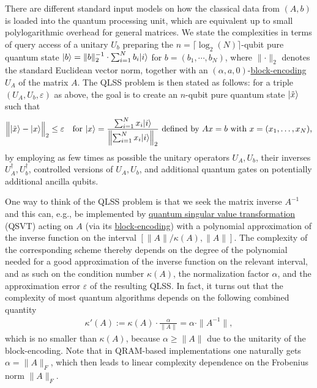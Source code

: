 \begin{refsection}
There are different standard input models on how the classical data from $(A,b)$ is loaded into the quantum processing unit, which are equivalent up to small polylogarithmic overhead for general matrices. We state the complexities in terms of query access of a unitary $U_b$ preparing the $n=\lceil\log_2(N)\rceil$-qubit pure quantum state $\lvert b\rangle=\|b\|_2^{-1}\cdot\sum_{i=1}^Nb_i\lvert i\rangle$ for $b=(b_1,\cdots,b_N)$, where $\lVert \cdot \rVert_2$ denotes the standard Euclidean vector norm, together with an $(\alpha,a,0)$-\hyperref[prim:BlockEncodings]{block-encoding} $U_A$ of the matrix $A$. The QLSS problem is then stated as follows: for a triple $(U_A,U_b,\varepsilon)$ as above, the goal is to create an $n$-qubit pure quantum state $ \lvert\tilde x\rangle$ such that
\begin{align}\label{eq:regression}
\Big\|\lvert\tilde x\rangle-\lvert x\rangle\Big\|_2\leq\varepsilon\quad\text{for $\lvert x\rangle=\frac{\sum_{i=1}^Nx_i\lvert i\rangle}{\left\|\sum_{i=1}^Nx_i\lvert i\rangle\right\|_2}$ defined by $A x=b$ with $x=(x_1,\ldots,x_N)$,}
\end{align}
by employing as few times as possible the unitary operators $U_A,U_b$, their inverses $U_A^\dagger,U_b^\dagger$, controlled versions of $U_A,U_b$, and additional quantum gates on potentially additional ancilla qubits.

One way to think of the QLSS problem is that we seek the matrix inverse $A^{-1}$ and this can, e.g., be implemented by \hyperref[prim:QSVT]{quantum singular value transformation} (QSVT) acting on $A$ (via its \hyperref[prim:BlockEncodings]{block-encoding}) with a polynomial approximation of the inverse function on the interval $[\|A\|/\kappa(A),\|A\|]$. The complexity of the corresponding scheme thereby depends on the degree of the polynomial needed for a good approximation of the inverse function on the relevant interval, and as such on the condition number $\kappa(A)$, the normalization factor $\alpha$, and the approximation error $\varepsilon$ of the resulting QLSS. In fact, it turns out that the complexity of most quantum algorithms depends on the following combined quantity
\begin{align}\label{eq:kappa-prime}
 \kappa'(A):=\kappa(A)\cdot\frac{\alpha}{\|A\|}=\alpha\cdot\|A^{-1}\|,
\end{align}
which is no smaller than $\kappa(A)$, because $\alpha\geq \|A\|$ due to the unitarity of the block-encoding.
Note that in QRAM-based implementations one naturally gets $\alpha=\|A\|_F$, which then leads to linear complexity dependence on the Frobenius norm $\|A\|_F$. 


\end{refsection}
